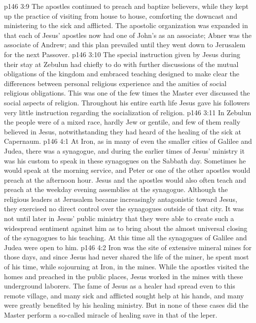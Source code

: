 \pc \vs p146 3:9 The apostles continued to preach and baptize believers, while they kept up the practice of visiting from house to house, comforting the downcast and ministering to the sick and afflicted. The apostolic organization was expanded in that each of Jesus’ apostles now had one of John’s as an associate; Abner was the associate of Andrew; and this plan prevailed until they went down to Jerusalem for the next Passover.
\pc \vs p146 3:10 The special instruction given by Jesus during their stay at Zebulun had chiefly to do with further discussions of the mutual obligations of the kingdom and embraced teaching designed to make clear the differences between personal religious experience and the amities of social religious obligations. This was one of the few times the Master ever discussed the social aspects of religion. Throughout his entire earth life Jesus gave his followers very little instruction regarding the socialization of religion.
\vs p146 3:11 In Zebulun the people were of a mixed race, hardly Jew or gentile, and few of them really believed in Jesus, notwithstanding they had heard of the healing of the sick at Capernaum.
\vs p146 4:1 At Iron, as in many of even the smaller cities of Galilee and Judea, there was a synagogue, and during the earlier times of Jesus’ ministry it was his custom to speak in these synagogues on the Sabbath day. Sometimes he would speak at the morning service, and Peter or one of the other apostles would preach at the afternoon hour. Jesus and the apostles would also often teach and preach at the weekday evening assemblies at the synagogue. Although the religious leaders at Jerusalem became increasingly antagonistic toward Jesus, they exercised no direct control over the synagogues outside of that city. It was not until later in Jesus’ public ministry that they were able to create such a widespread sentiment against him as to bring about the almost universal closing of the synagogues to his teaching. At this time all the synagogues of Galilee and Judea were open to him.
\vs p146 4:2 Iron was the site of extensive mineral mines for those days, and since Jesus had never shared the life of the miner, he spent most of his time, while sojourning at Iron, in the mines. While the apostles visited the homes and preached in the public places, Jesus worked in the mines with these underground laborers. The fame of Jesus as a healer had spread even to this remote village, and many sick and afflicted sought help at his hands, and many were greatly benefited by his healing ministry. But in none of these cases did the Master perform a so\hyp{}called miracle of healing save in that of the leper.
